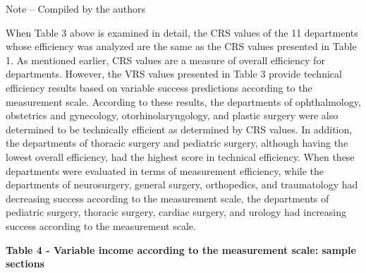 Note -- Compiled by the authors

\begin{multicols}{2}
When Table 3 above is examined in detail, the CRS values
\hspace{0pt}\hspace{0pt}of the 11 departments whose efficiency was
analyzed are the same as the CRS values
\hspace{0pt}\hspace{0pt}presented in Table 1. As mentioned earlier, CRS
values \hspace{0pt}\hspace{0pt}are a measure of overall efficiency for
departments. However, the VRS values \hspace{0pt}\hspace{0pt}presented
in Table 3 provide technical efficiency results based on variable
success predictions according to the measurement scale. According to
these results, the departments of ophthalmology, obstetrics and
gynecology, otorhinolaryngology, and plastic surgery were also
determined to be technically efficient as determined by CRS values. In
addition, the departments of thoracic surgery and pediatric surgery,
although having the lowest overall efficiency, had the highest score in
technical efficiency. When these departments were evaluated in terms of
measurement efficiency, while the departments of neurosurgery, general
surgery, orthopedics, and traumatology had decreasing success according
to the measurement scale, the departments of pediatric surgery, thoracic
surgery, cardiac surgery, and urology had increasing success according
to the measurement scale.
\end{multicols}

{\bfseries Table 4 - Variable income according to the measurement scale: sample sections}

